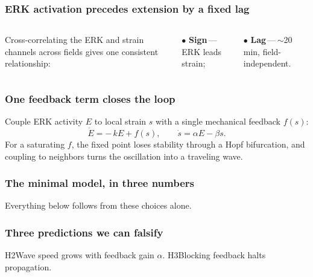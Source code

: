 \documentclass[aspectratio=169, 11pt, t]{beamer}
\begin{document}
\begin{frame}
  \frametitle{ERK activation precedes extension by a fixed lag}
  \begin{columns}[T, onlytextwidth]
      \vskip0.1cm
      Cross-correlating the ERK and strain channels across fields gives one
      consistent relationship:\par\vskip0.15cm
      $\bullet$ \textbf{Sign}\,---\,ERK leads strain;\par\vskip0.1cm
      $\bullet$ \textbf{Lag}\,---\,$\sim$20 min, field-independent.
      \centering
  \end{columns}
\end{frame}


\begin{frame}
  \frametitle{One feedback term closes the loop}
  \vskip0.1cm
  Couple ERK activity $E$ to local strain $s$ with a single mechanical feedback $f(s)$:
  \vskip0.1cm
  \[ \dot E = -\,kE + f(s), \qquad \dot s = \alpha E - \beta s. \]
  \vskip0.1cm
  For a saturating $f$, the fixed point loses stability through a Hopf bifurcation,
  and coupling to neighbors turns the oscillation into a \alert{traveling wave}.
\end{frame}

\begin{frame}
  \frametitle{The minimal model, in three numbers}
  \vskip0.2cm
  \vskip0.6cm
  \begin{center}\small
  Everything below follows from these choices alone.
  \end{center}
\end{frame}


\begin{frame}
  \frametitle{Three predictions we can falsify}
  \vskip0.1cm
          {H2}{Wave speed grows with feedback gain $\alpha$.}
          {H3}{Blocking feedback halts propagation.}
\end{frame}
\end{document}
